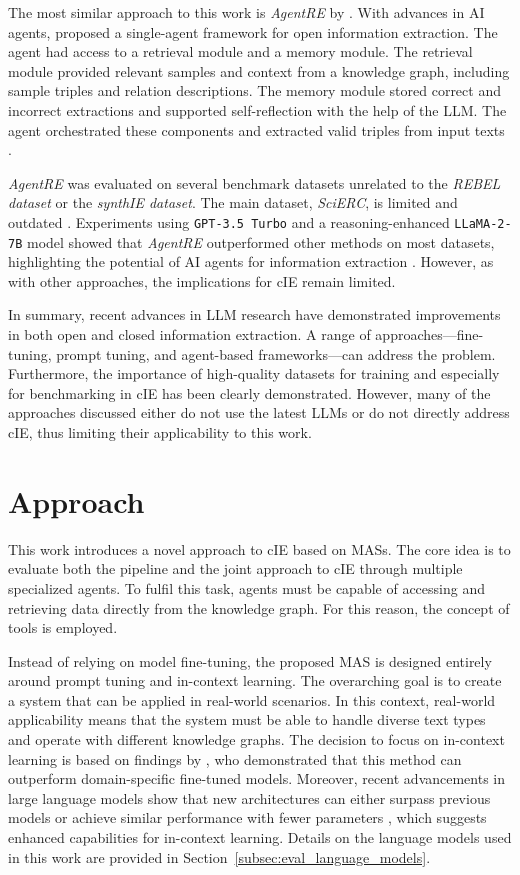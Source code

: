 \documentclass[a4paper,oneside,bibliography=totoc]{scrbook}
\begin{document}
The most similar approach to this work is \textit{AgentRE} by \citet{Shi2024}. With advances in AI agents, \citet{Shi2024} proposed a single-agent framework for open information extraction. The agent had access to a retrieval module and a memory module. The retrieval module provided relevant samples and context from a knowledge graph, including sample triples and relation descriptions. The memory module stored correct and incorrect extractions and supported self-reflection with the help of the \ac{LLM}. The agent orchestrated these components and extracted valid triples from input texts \cite{Shi2024}.

\textit{AgentRE} was evaluated on several benchmark datasets unrelated to the \textit{REBEL dataset} or the \textit{synthIE dataset}. The main dataset, \textit{SciERC}, is limited and outdated \cite{Luan2018}. Experiments using \texttt{GPT-3.5 Turbo} and a reasoning-enhanced \texttt{LLaMA-2-7B} model showed that \textit{AgentRE} outperformed other methods on most datasets, highlighting the potential of AI agents for information extraction \cite{Shi2024}. However, as with other approaches, the implications for \ac{cIE} remain limited.

In summary, recent advances in \ac{LLM} research have demonstrated improvements in both open and closed information extraction. A range of approaches—fine-tuning, prompt tuning, and agent-based frameworks—can address the problem. Furthermore, the importance of high-quality datasets for training and especially for benchmarking in \ac{cIE} has been clearly demonstrated. However, many of the approaches discussed either do not use the latest \acp{LLM} or do not directly address \ac{cIE}, thus limiting their applicability to this work.

\chapter{Approach}
\label{ch:approach}

This work introduces a novel approach to \ac{cIE} based on \acp{MAS}. The core idea is to evaluate both the pipeline and the joint approach to \ac{cIE} through multiple specialized agents. To fulfil this task, agents must be capable of accessing and retrieving data directly from the knowledge graph. For this reason, the concept of tools is employed.

Instead of relying on model fine-tuning, the proposed \ac{MAS} is designed entirely around prompt tuning and in-context learning. The overarching goal is to create a system that can be applied in real-world scenarios. In this context, real-world applicability means that the system must be able to handle diverse text types and operate with different knowledge graphs. The decision to focus on in-context learning is based on findings by \citet{Brown2020}, who demonstrated that this method can outperform domain-specific fine-tuned models. Moreover, recent advancements in large language models show that new architectures can either surpass previous models or achieve similar performance with fewer parameters \cite{MetaAI2025,Chiang2024}, which suggests enhanced capabilities for in-context learning. Details on the language models used in this work are provided in Section~\ref{subsec:eval_language_models}.
\end{document}
